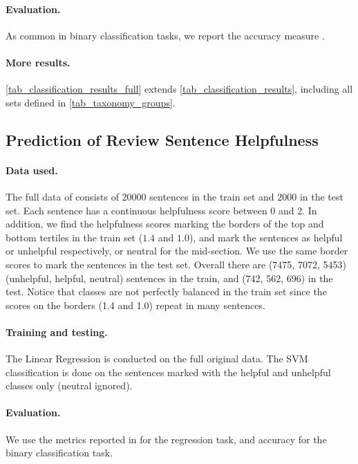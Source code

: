 \paragraph{Evaluation.}
As common in binary classification tasks, we report the accuracy measure \citep{Yadav2020sentAna}.

\paragraph{More results.}
\autoref{tab_classification_results_full} extends \autoref{tab_classification_results}, including all \taxtype{} sets defined in \autoref{tab_taxonomy_groups}.


\subsection{Prediction of Review Sentence Helpfulness}
\label{sec_appendix_experiments_sentence_helpfulness}



\paragraph{Data used.}
The full data of \citet{gamzu2021helpfulsentences} consists of 20000 sentences in the train set and 2000 in the test set. Each sentence has a continuous helpfulness score between 0 and 2. In addition, we find the helpfulness scores marking the borders of the top and bottom tertiles in the train set ($1.4$ and $1.0$), and mark the sentences as helpful or unhelpful respectively, or neutral for the mid-section. We use the same border scores to mark the sentences in the test set. Overall there are (7475, 7072, 5453) (unhelpful, helpful, neutral) sentences in the train, and (742, 562, 696) in the test. Notice that classes are not perfectly balanced in the train set since the scores on the borders (1.4 and 1.0) repeat in many sentences.

\paragraph{Training and testing.}
The Linear Regression is conducted on the full original data. The SVM classification is done on the sentences marked with the helpful and unhelpful classes only (neutral ignored).


\paragraph{Evaluation.}
We use the metrics reported in \citep{gamzu2021helpfulsentences} for the regression task, and accuracy for the binary classification task.

